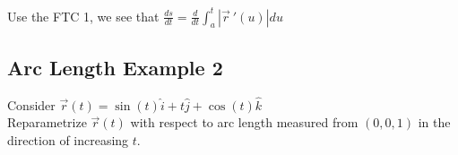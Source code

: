 \documentclass[12pt]{article}
\begin{document}
Use the FTC 1, we see that \(\frac{ds}{dt}= \frac{d}{dt}\int_{a}^{t} |\vec{r}\ '(u) |du\) 

\subsection{Arc Length Example 2}
Consider \(\vec{r} (t) = \sin(t) \hat{i} + t\hat{j} + \cos(t)\hat{k}\) \\%
Reparametrize \(\vec{r} (t) \) with respect to arc length measured from \((0,0,1)\) in the direction of increasing \(t\). 
\end{document}
